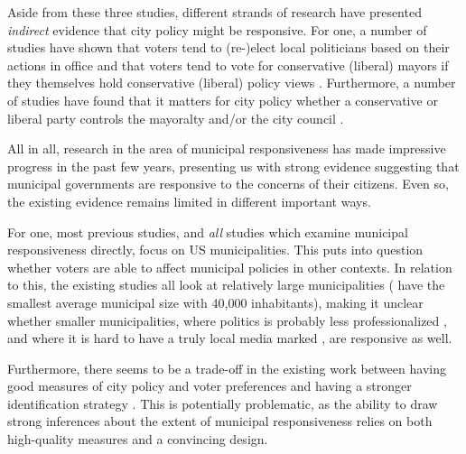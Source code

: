 \documentclass[a4paper,12pt]{article}
\begin{document}
Aside from these three studies, different strands of research have presented \textit{indirect} evidence that city policy might be responsive. For one, a number of studies have shown that voters tend to (re-)elect local politicians based on their actions in office \citep{arnold2012holding,burnett2017politics} and that voters tend to vote for conservative (liberal)  mayors if they themselves hold conservative (liberal) policy views  \citep{sances2017ideology,boudreau2015lost,hopkins2017retrospective}. Furthermore, a number of studies have found that it matters for city policy whether a conservative or liberal party controls the mayoralty and/or the city council \citep{fiva2016power,folke2014shades,blom2006parties,de2016mayoral}. 


All in all, research in the area of municipal responsiveness has made impressive progress in the past few years, presenting us with strong evidence suggesting that municipal governments are responsive to the concerns of their citizens. Even so, the existing evidence remains limited in different important ways.

For one, most previous studies, and \textit{all} studies which examine municipal responsiveness directly, focus on US municipalities. This puts into question whether voters are able to affect municipal policies in other contexts. In relation to this, the existing studies all look at relatively large municipalities (\citeauthor{einstein2016pushing} have the smallest average municipal size with 40,000 inhabitants), making it unclear whether smaller municipalities, where politics is probably less professionalized \cite{lewis2011size}, and where it is hard to have a truly local media marked \cite{snyder2010press}, are responsive as well.

Furthermore, there seems to be a trade-off in the existing work between having good measures of city policy and voter preferences \citep[cf.][]{tausanovitch2014representation} and having a stronger identification strategy \citep[cf.][]{sances2017voters}. This is potentially problematic, as the ability to draw strong inferences about the extent of municipal responsiveness relies on both high-quality measures and a convincing design.
\end{document}

